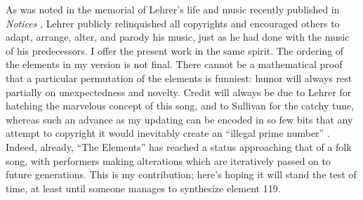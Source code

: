 \documentclass{article}
\begin{document}
As was noted in the memorial of Lehrer's life and music recently published in \emph{Notices} \citep{Courant_Lehrer}, Lehrer publicly relinquished all copyrights and encouraged others to adapt, arrange, alter, and parody his music, just as he had done with the music of his predecessors. I offer the present work in the same spirit. The ordering of the elements in my version is not final. There cannot be a mathematical proof that a particular permutation of the elements is funniest: humor will always rest partially on unexpectedness and novelty. Credit will always be due to Lehrer for hatching the marvelous concept of this song, and to Sullivan for the catchy tune, whereas such an advance as my updating can be encoded in so few bits that any attempt to copyright it would inevitably create an ``illegal prime number'' \citep{IllegalPrime}. Indeed, already, ``The Elements'' has reached a status approaching that of a folk song, with performers making alterations which are iteratively passed on to future generations. This is my contribution; here's hoping it will stand the test of time, at least until someone manages to synthesize element 119.






\end{document}
